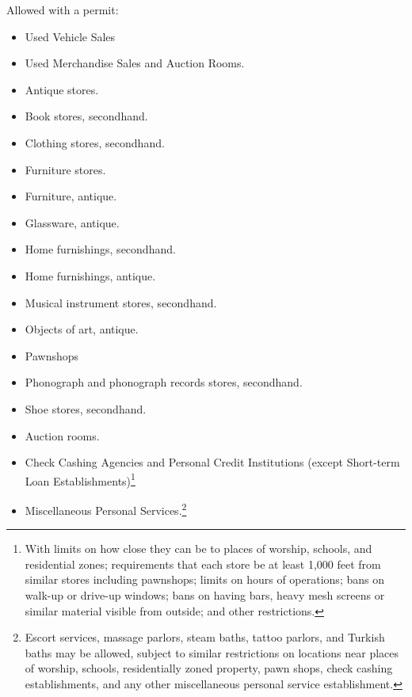 Allowed with a permit:
\begin{itemize}
\item Used Vehicle Sales 

\item Used Merchandise Sales and Auction Rooms.

\item Antique stores.

\item Book stores, secondhand.

\item Clothing stores, secondhand.

\item Furniture stores.

\item Furniture, antique.

\item Glassware, antique.

\item Home furnishings, secondhand.

\item Home furnishings, antique.

\item Musical instrument stores, secondhand.

\item Objects of art, antique.

\item Pawnshops

\item Phonograph and phonograph records stores, secondhand.

\item Shoe stores, secondhand.

\item Auction rooms.

\item Check Cashing Agencies and Personal Credit Institutions (except Short-term
Loan Establishments)\footnote{With limits on how close they can be to places of
worship, schools, and residential zones; requirements that each store be at
least 1,000 feet from similar stores including pawnshops; limits on hours of
operations; bans on walk-up or drive-up windows; bans on having bars, heavy mesh
screens or similar material visible from outside; and other restrictions.} 

\item Miscellaneous Personal Services.\footnote{Escort services, massage
parlors, steam baths, tattoo parlors, and Turkish baths may be allowed, subject
to similar restrictions on locations near places of worship, schools,
residentially zoned property, pawn shops, check cashing establishments, and any
other miscellaneous personal service establishment.} 


\end{itemize}

